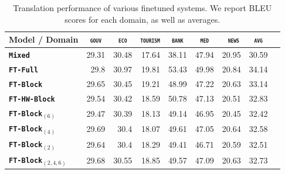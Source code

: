 \documentclass[11pt,a4paper]{article}
\newcommand{\fyDone}[1]{\done[FY]\Todo[FY:]{\textcolor{orange}{#1}}}
\newcommand{\domain}[1]{\texttt{\textsc{#1}}}
\newcommand{\system}[1]{\texttt{\textbf{#1}}}
\begin{document}
\begin{table}[htbp]
  \centering
  \fyDone{Fix column size}
  \begin{tabular}{|p{3cm}|*{8}{r|}} \hline
    Model / Domain & \multicolumn{1}{c|}{\domain{gouv}} & \multicolumn{1}{c|}{\domain{eco}} & \multicolumn{1}{c|}{\domain{tourism}} & \multicolumn{1}{c|}{\domain{bank}} & \multicolumn{1}{c|}{\domain{ med }} & \multicolumn{1}{c|}{\domain{ news}} & \multicolumn{1}{c|}{\domain{avg}} \\ \hline %
    \system{Mixed}  & 29.31 & 30.48 & 17.64 & 38.11 & 47.94 & 20.95  & 30.59 \\
    \system{FT-Full}       & 29.8 & 30.97 & 19.81 & 53.43 & 49.98 & 20.84 & 34.14 \\
   \system{FT-Block}     & 29.65 & 30.45 & 19.21 & 48.99 & 47.22 & 20.63 & 33.14 \\ 
   \system{FT-HW-Block}   & 29.54 & 30.42 & 18.59 & 50.78 & 47.13 & 20.51 & 32.83 \\ 
   \system{FT-Block$_{(6)}$}     & 29.47 & 30.39 & 18.13 & 49.14 & 46.95 & 20.45 & 32.42 \\
   \system{FT-Block$_{(4)}$}     & 29.69 & 30.4 & 18.07 & 49.61 & 47.05 & 20.64 & 32.58 \\
   \system{FT-Block$_{(2)}$}   & 29.64 & 30.4 & 18.29 & 49.41 & 46.71 & 20.59 & 32.51  \\
   \system{FT-Block$_{(2,4,6)}$}  & 29.68  & 30.55 & 18.85 & 49.57 & 47.09 & 20.63 &  32.73  \\
     \hline
  \end{tabular}
  \caption{Translation performance of various finetuned systems. We report BLEU scores for each domain, as well as averages.}
  \label{tab:performance-en-de}
\end{table}
\end{document}
